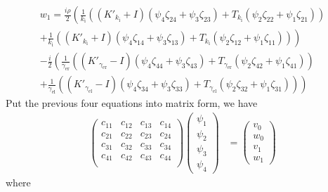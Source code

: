 \begin{multline*}
  w_1 = \frac{i \rho}{2} \left(\frac{1}{k_\text{i}}\left((K'_{k_\text{i}}+I)(\psi_4 \zeta_{24}+\psi_3 \zeta_{23}) +T_{k_\text{i}} (\psi_2 \zeta_{22}+\psi_1 \zeta_{21})\right)\right.\\
  \left.+\frac{1}{k_\text{i}}\left((K'_{k_\text{i}} + I)(\psi_4 \zeta_{14}+\psi_3 \zeta_{13})+T_{k_\text{i}} (\psi_2 \zeta_{12}+\psi_1 \zeta_{11})\right)\right) \\
  -\frac{i}{2} \left(\frac{1}{\gamma_\text{er}}\left((K'_{\gamma_\text{er}}-I)(\psi_4 \zeta_{44}+\psi_3 \zeta_{43}) +T_{\gamma_\text{er}}(\psi_2 \zeta_{42}+\psi_1 \zeta_{41})\right)\right.\\
  \left.+\frac{1}{\gamma_\text{el}}\left((K'_{\gamma_\text{el}}-I)(\psi_4 \zeta_{34}+\psi_3 \zeta_{33}) +T_{\gamma_\text{el}} (\psi_2 \zeta_{32}+\psi_1 \zeta_{31})\right)\right)
\end{multline*}
Put the previous four equations into matrix form, we have
\begin{align*}
  \begin{pmatrix}
    c_{11} & c_{12} & c_{13} & c_{14} \\
    c_{21} & c_{22} & c_{23} & c_{24} \\
    c_{31} & c_{32} & c_{33} & c_{34} \\
    c_{41} & c_{42} & c_{43} & c_{44} \\
  \end{pmatrix} 
  \begin{pmatrix}
    \psi_1 \\ \psi_2 \\ \psi_3 \\ \psi_4
  \end{pmatrix} &=
  \begin{pmatrix}
    v_0 \\ w_0 \\ v_1 \\ w_1
  \end{pmatrix}
\end{align*}
where
